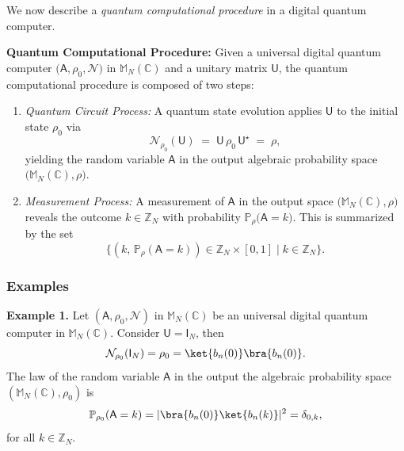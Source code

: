 \documentclass[a4paper,11pt]{article}
\newcommand{\rI}{\mathsf{I}}
\newcommand{\rU}{\mathsf{U}}
\newcommand{\rA}{\mathsf{A}}
\begin{document}
We now describe a \emph{quantum computational procedure} in a digital quantum computer.

\bigskip

\noindent\textbf{Quantum Computational Procedure:}
Given a universal digital quantum computer \(\bigl(\rA, \rho_0, \mathcal{N}\bigr)\) in \(\mathbb{M}_N(\mathbb{C})\) 
and a unitary matrix \(\rU\), the quantum computational procedure is composed of two steps:

\begin{enumerate}
  \item[\textbf{(a)}] \emph{Quantum Circuit Process:}  
  A quantum state evolution applies \(\rU\) to the initial state \(\rho_0\) via
  \[
  \mathcal{N}_{\rho_0}(\rU) 
  \;=\; \rU\,\rho_0\,\rU^{\star} 
  \;=\; \rho,
  \]
  yielding the random variable \(\rA\) in the output algebraic probability space 
  \(\bigl(\mathbb{M}_N(\mathbb{C}), \rho\bigr)\).

  \item[\textbf{(b)}] \emph{Measurement Process:}  
  A measurement of \(\rA\) in the output space \(\bigl(\mathbb{M}_N(\mathbb{C}), \rho\bigr)\) reveals 
  the outcome \(k \in \mathbb{Z}_N\) with probability \(\mathbb{P}_{\rho}\bigl(\rA = k\bigr)\). 
  This is summarized by the set
  \[
  \bigl\{(k,\, \mathbb{P}_{\rho}(\rA = k)) \in \mathbb{Z}_N \times [0,1] 
  \;\bigl|\; k \in \mathbb{Z}_N \bigr\}.
  \]
\end{enumerate}


\subsubsection{Examples}

\textbf{Example 1.} Let \((\rA, \rho_0, \mathcal{N})\) in \(\mathbb{M}_N(\mathbb{C})\) be an universal digital quantum computer in \(\mathbb{M}_N(\mathbb{C})\). Consider \(\rU = \rI_N\), then
\[
\mathcal{N}_{\rho_0}(\rI_N) = \rho_0 = \ket{b_n(0)}\bra{b_n(0)}.
\]
The law of the random variable \(\rA\) in the output the algebraic probability space \((\mathbb{M}_N(\mathbb{C}), \rho_0)\) is
\[
\mathbb{P}_{\rho_0}(\rA = k) = |\bra{b_n(0)}\ket{b_n(k)}|^2 = \delta_{0,k},
\]
for all \(k \in \mathbb{Z}_N\).

\bigskip
\end{document}
